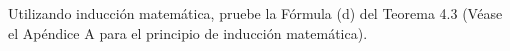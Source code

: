 \item Utilizando inducción matemática, pruebe la Fórmula (d) del Teorema 4.3 (Véase el Apéndice A para el principio de inducción matemática).
